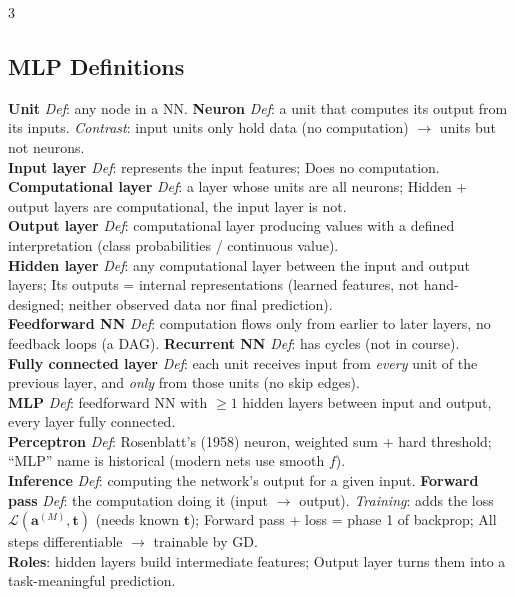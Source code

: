 \documentclass[10pt]{article}
\newcommand{\vt}{\mathbf{t}}
\newcommand{\cL}{\mathcal{L}}
\newcommand{\sub}[1]{\textit{#1}:}  %
\newcommand{\va}{\mathbf{a}}
\begin{document}
\begin{multicols*}{3}
\subsection{MLP Definitions}
\textbf{Unit} \sub{Def} any node in a NN. \textbf{Neuron} \sub{Def} a unit that computes its output from its inputs. \sub{Contrast} input units only hold data (no computation) $\to$ units but not neurons.\\
\textbf{Input layer} \sub{Def} represents the input features; Does no computation.\\
\textbf{Computational layer} \sub{Def} a layer whose units are all neurons; Hidden + output layers are computational, the input layer is not.\\
\textbf{Output layer} \sub{Def} computational layer producing values with a defined interpretation (class probabilities / continuous value).\\
\textbf{Hidden layer} \sub{Def} any computational layer between the input and output layers; Its outputs = internal representations (learned features, not hand-designed; neither observed data nor final prediction).\\
\textbf{Feedforward NN} \sub{Def} computation flows only from earlier to later layers, no feedback loops (a DAG). \textbf{Recurrent NN} \sub{Def} has cycles (not in course).\\
\textbf{Fully connected layer} \sub{Def} each unit receives input from \emph{every} unit of the previous layer, and \emph{only} from those units (no skip edges).\\
\textbf{MLP} \sub{Def} feedforward NN with $\ge1$ hidden layers between input and output, every layer fully connected.\\
\textbf{Perceptron} \sub{Def} Rosenblatt's (1958) neuron, weighted sum + hard threshold; ``MLP'' name is historical (modern nets use smooth $f$).\\
\textbf{Inference} \sub{Def} computing the network's output for a given input. \textbf{Forward pass} \sub{Def} the computation doing it (input $\to$ output). \sub{Training} adds the loss $\cL(\va^{(M)},\vt)$ (needs known $\vt$); Forward pass + loss = phase 1 of backprop; All steps differentiable $\to$ trainable by GD.\\
\textbf{Roles}: hidden layers build intermediate features; Output layer turns them into a task-meaningful prediction.


\end{multicols*}
\end{document}
